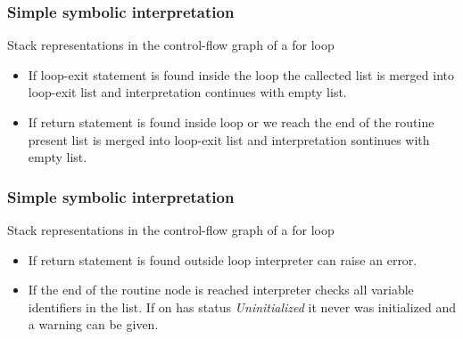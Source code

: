\documentclass[presentation]{beamer}
\begin{document}
\begin{frame}
  \frametitle{Simple symbolic interpretation}
  
  \begin{block}{Stack representations in the control-flow graph of a for loop}
  \begin{itemize}
      \item If loop-exit statement is found inside the loop the callected list is merged into loop-exit list and interpretation continues with empty list.\\
      \item If return statement is found inside loop or we reach the end of the routine present list is merged into loop-exit list and interpretation sontinues with empty list.
  \end{itemize}
  \end{block}
  
\end{frame}

\begin{frame}
  \frametitle{Simple symbolic interpretation}
  \begin{block}{Stack representations in the control-flow graph of a for loop}
  \begin{itemize}
      \item If return statement is found outside loop interpreter can raise an error.
      \item If the end of the routine node is reached interpreter checks all variable identifiers in the list. If on has status \emph{Uninitialized} it never was initialized and a warning can be given.
  \end{itemize}
  \end{block}
  
\end{frame}
\end{document}
